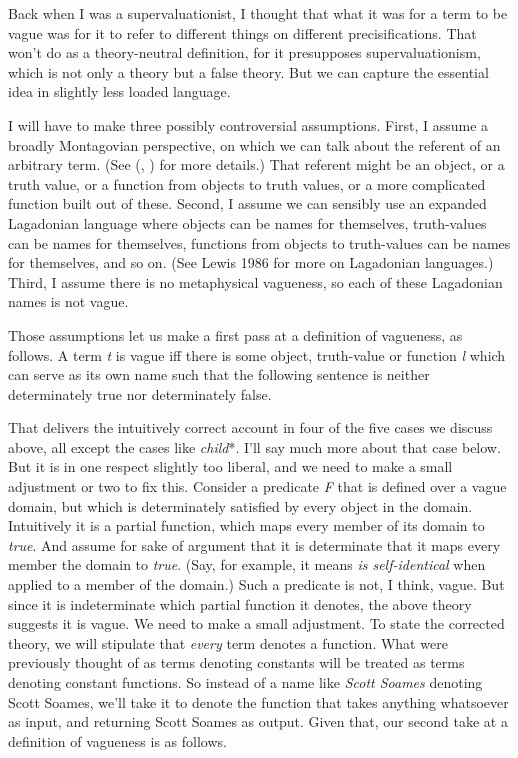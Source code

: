 \documentclass[
  11pt,
  letterpaper,
  DIV=11,
  numbers=noendperiod,
  twoside]{scrartcl}
\begin{document}
Back when I was a supervaluationist, I thought that what it was for a
term to be vague was for it to refer to different things on different
precisifications. That won't do as a theory-neutral definition, for it
presupposes supervaluationism, which is not only a theory but a false
theory. But we can capture the essential idea in slightly less loaded
language.

I will have to make three possibly controversial assumptions. First, I
assume a broadly Montagovian perspective, on which we can talk about the
referent of an arbitrary term. (See
(,
) for more details.) That referent
might be an object, or a truth value, or a function from objects to
truth values, or a more complicated function built out of these. Second,
I assume we can sensibly use an expanded Lagadonian language where
objects can be names for themselves, truth-values can be names for
themselves, functions from objects to truth-values can be names for
themselves, and so on. (See Lewis 1986 for more on Lagadonian
languages.) Third, I assume there is no metaphysical vagueness, so each
of these Lagadonian names is not vague.

Those assumptions let us make a first pass at a definition of vagueness,
as follows. A term \emph{t} is vague iff there is some object,
truth-value or function \emph{l} which can serve as its own name such
that the following sentence is neither determinately true nor
determinately false.

That delivers the intuitively correct account in four of the five cases
we discuss above, all except the cases like \emph{child}*. I'll say much
more about that case below. But it is in one respect slightly too
liberal, and we need to make a small adjustment or two to fix this.
Consider a predicate \emph{F} that is defined over a vague domain, but
which is determinately satisfied by every object in the domain.
Intuitively it is a partial function, which maps every member of its
domain to \emph{true}. And assume for sake of argument that it is
determinate that it maps every member the domain to \emph{true}. (Say,
for example, it means \emph{is self-identical} when applied to a member
of the domain.) Such a predicate is not, I think, vague. But since it is
indeterminate which partial function it denotes, the above theory
suggests it is vague. We need to make a small adjustment. To state the
corrected theory, we will stipulate that \emph{every} term denotes a
function. What were previously thought of as terms denoting constants
will be treated as terms denoting constant functions. So instead of a
name like \emph{Scott Soames} denoting Scott Soames, we'll take it to
denote the function that takes anything whatsoever as input, and
returning Scott Soames as output. Given that, our second take at a
definition of vagueness is as follows.
\end{document}
